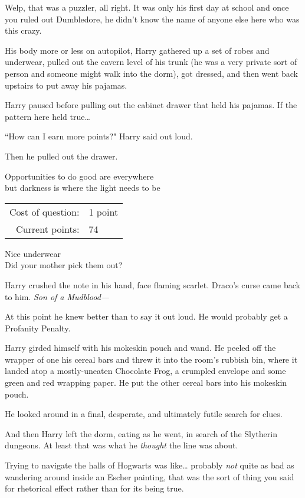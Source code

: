 Welp, that was a puzzler, all right. It was only his first day at school and once you ruled out Dumbledore, he didn't know the name of anyone else here who was this crazy.

His body more or less on autopilot, Harry gathered up a set of robes and underwear, pulled out the cavern level of his trunk (he was a very private sort of person and someone might walk into the dorm), got dressed, and then went back upstairs to put away his pajamas.

Harry paused before pulling out the cabinet drawer that held his pajamas. If the pattern here held true{\ldots}

``How can I earn more points?" Harry said out loud.

Then he pulled out the drawer.
\begin{writtenNote}
Opportunities to do good are everywhere\\
but darkness is where the light needs to be

\begin{tabular}{rl}
Cost of question: & 1 point\\
Current points: & 74
\end{tabular}

Nice underwear\\
Did your mother pick them out?
\end{writtenNote}

Harry crushed the note in his hand, face flaming scarlet. Draco's curse came back to him. \emph{Son of a Mudblood—}

At this point he knew better than to say it out loud. He would probably get a Profanity Penalty.

Harry girded himself with his mokeskin pouch and wand. He peeled off the wrapper of one his cereal bars and threw it into the room's rubbish bin, where it landed atop a mostly-uneaten Chocolate Frog, a crumpled envelope and some green and red wrapping paper. He put the other cereal bars into his mokeskin pouch.

He looked around in a final, desperate, and ultimately futile search for clues.

And then Harry left the dorm, eating as he went, in search of the Slytherin dungeons. At least that was what he \emph{thought} the line was about.

Trying to navigate the halls of Hogwarts was like{\ldots} probably \emph{not} quite as bad as wandering around inside an Escher painting, that was the sort of thing you said for rhetorical effect rather than for its being true.

